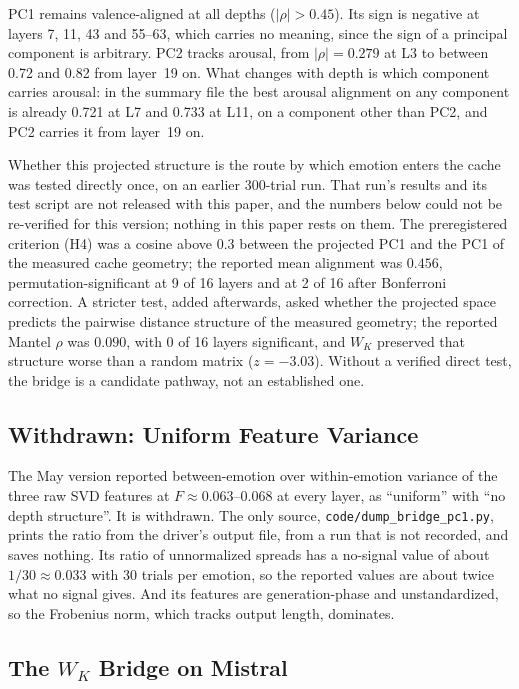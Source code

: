 \documentclass[11pt,a4paper]{article}
\begin{document}
PC1 remains valence-aligned at all depths ($|\rho| > 0.45$). Its sign is negative at layers 7, 11, 43 and 55--63, which carries no meaning, since the sign of a principal component is arbitrary. PC2 tracks arousal, from $|\rho| = 0.279$ at L3 to between 0.72 and 0.82 from layer~19 on. What changes with depth is which component carries arousal: in the summary file the best arousal alignment on any component is already 0.721 at L7 and 0.733 at L11, on a component other than PC2, and PC2 carries it from layer~19 on.

Whether this projected structure is the route by which emotion enters the cache was tested directly once, on an earlier 300-trial run. That run's results and its test script are not released with this paper, and the numbers below could not be re-verified for this version; nothing in this paper rests on them. The preregistered criterion (H4) was a cosine above $0.3$ between the projected PC1 and the PC1 of the measured cache geometry; the reported mean alignment was $0.456$, permutation-significant at 9 of 16 layers and at 2 of 16 after Bonferroni correction. A stricter test, added afterwards, asked whether the projected space predicts the pairwise distance structure of the measured geometry; the reported Mantel $\rho$ was $0.090$, with 0 of 16 layers significant, and $W_K$ preserved that structure worse than a random matrix ($z = -3.03$). Without a verified direct test, the bridge is a candidate pathway, not an established one.

\subsection{Withdrawn: Uniform Feature Variance}
\label{sec:fratio}

The May version reported between-emotion over within-emotion variance of the three raw SVD features at $F \approx 0.063$--$0.068$ at every layer, as ``uniform'' with ``no depth structure''. It is withdrawn. The only source, \texttt{code/dump\_bridge\_pc1.py}, prints the ratio from the driver's output file, from a run that is not recorded, and saves nothing. Its ratio of unnormalized spreads has a no-signal value of about $1/30 \approx 0.033$ with 30 trials per emotion, so the reported values are about twice what no signal gives. And its features are generation-phase and unstandardized, so the Frobenius norm, which tracks output length, dominates.

\subsection{The $W_K$ Bridge on Mistral}
\label{sec:crossarch}
\end{document}
